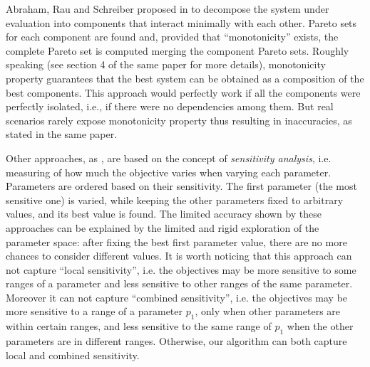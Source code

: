 Abraham, Rau and Schreiber proposed in \cite{santosh_hptr00} to
decompose the system under evaluation into components that interact
minimally with each other. Pareto sets for each component are found
and, provided that ``monotonicity'' exists, the complete Pareto set is
computed merging the component Pareto sets. Roughly speaking (see
section 4 of the same paper for more details), monotonicity property
guarantees that the best system can be obtained as a composition of
the best components. This approach would perfectly work if all the
components were perfectly isolated, i.e., if there were no
dependencies among them. But real scenarios rarely expose monotonicity
property thus resulting in inaccuracies, as stated in the same paper.

Other approaches, as \cite{fornaciari_codes01,palesi_iwsoc02}, are
based on the concept of \emph{sensitivity analysis}, i.e. measuring of
how much the objective varies when varying each parameter.  Parameters
are ordered based on their sensitivity. The first parameter (the most
sensitive one) is varied, while keeping the other parameters fixed to
arbitrary values, and its best value is found. The limited accuracy
shown by these approaches can be explained by the limited and rigid
exploration of the parameter space: after fixing the best first
parameter value, there are no more chances to consider different
values. It is worth noticing that this approach can not capture
``local sensitivity'', i.e. the objectives may be more sensitive to
some ranges of a parameter and less sensitive to other ranges of the
same parameter. Moreover it can not capture ``combined sensitivity'',
i.e. the objectives may be more sensitive to a range of a parameter
$p_{1}$, only when other parameters are within certain ranges, and
less sensitive to the same range of $p_{1}$ when the other parameters
are in different ranges. Otherwise, our algorithm can both capture
local and combined sensitivity.

